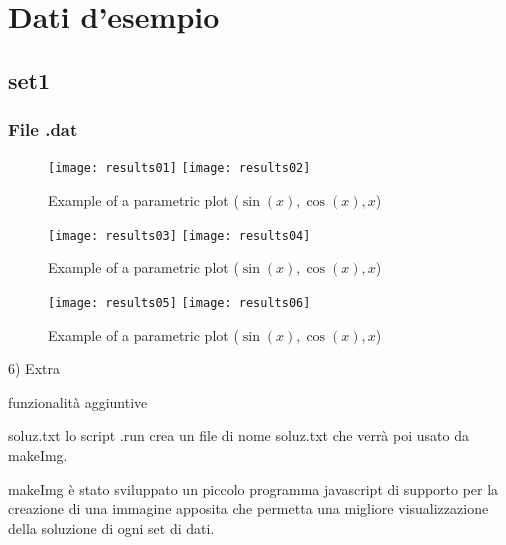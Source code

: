 
\section{Dati d'esempio}
	\subsection{set1}

	\subsubsection{File .dat}
		

\newpage



\begin{figure}[h]
\caption{Example of a parametric plot ($\sin (x), \cos(x), x$)}

	\texttt{[image: results01]}
	\hspace{1cm}
	\texttt{[image: results02]}
\end{figure}


\begin{figure}[h]
\caption{Example of a parametric plot ($\sin (x), \cos(x), x$)}
\begin{center}
	\texttt{[image: results03]}
	\hspace{1cm}
	\texttt{[image: results04]}
\end{center}
\end{figure}


\begin{figure}[h]
\caption{Example of a parametric plot ($\sin (x), \cos(x), x$)}

	\texttt{[image: results05]}
	\hspace{1cm}
	\texttt{[image: results06]}
\end{figure}


	\newpage





6) Extra


funzionalità aggiuntive


soluz.txt
lo script .run crea un file di nome soluz.txt che verrà poi usato da makeImg.


makeImg
è stato sviluppato un piccolo programma javascript di supporto per la creazione di una immagine apposita che permetta una migliore visualizzazione della soluzione di ogni set di dati.